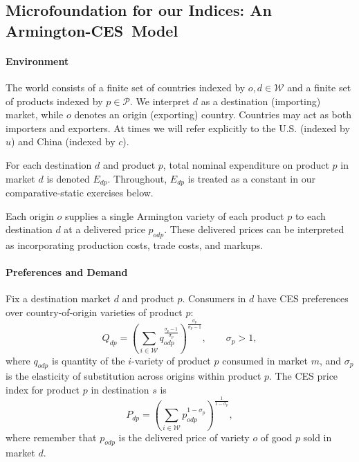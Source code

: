 \documentclass[english,12pt]{article}
\theoremstyle{definition}
\begin{document}
\subsection{Microfoundation for our Indices: An Armington-CES\ Model \label{App: MicroFound}}

\paragraph{Environment}

The world consists of a finite set of countries indexed by $o,d\in \mathcal{W%
}$ and a finite set of products indexed by $p\in \mathcal{P}$. We interpret $%
d$ as a destination (importing) market, while $o$ denotes an origin
(exporting) country. Countries may act as both importers and exporters. At
times we will refer explicitly to the U.S. (indexed by $u$) and China
(indexed by $c$).

For each destination $d$ and product $p$, total nominal expenditure on
product $p$ in market $d$ is denoted $E_{dp}$. Throughout, $E_{dp}$ is
treated as a constant in our comparative-static exercises below.

Each origin $o$ supplies a single Armington variety of each product $p$ to
each destination $d$ at a delivered price $p_{odp}$. These delivered prices
can be interpreted as incorporating production costs, trade costs, and
markups.

\paragraph{Preferences and Demand}

Fix a destination market $d$ and product $p$. Consumers in $d$ have CES
preferences over country-of-origin varieties of product $p$: 
\begin{equation}
Q_{dp}=\left( \sum_{i\in \mathcal{W}}q_{odp}^{\frac{\sigma _{p}-1}{\sigma
_{p}}}\right) ^{\frac{\sigma _{p}}{\sigma _{p}-1}},\qquad \sigma _{p}>1,
\label{eq: CES aggregator}
\end{equation}%
where $q_{odp}$ is quantity of the $i$-variety of product $p$ consumed in
market $m$, and $\sigma _{p}$ is the elasticity of substitution across
origins within product $p$. The CES price index for product $p$ in
destination $s$ is 
\begin{equation*}
P_{dp}=\left( \sum_{i\in \mathcal{W}}p_{odp}^{1-\sigma _{p}}\right) ^{\frac{1%
}{1-\sigma _{p}}},
\end{equation*}%
where remember that $p_{odp}$ is the delivered price of variety $o$ of good $%
p$ sold in market $d$.
\end{document}
